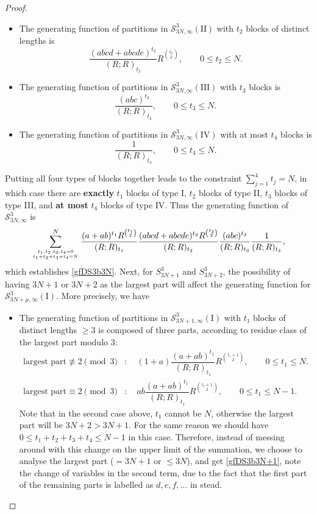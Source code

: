 \documentclass[12pt]{amsart}
\numberwithin{equation}{section}
\theoremstyle{plain}
\theoremstyle{definition}
\begin{document}
\begin{proof}
\begin{itemize}
\item[II.] The generating function of partitions in $\mathcal{S}^3_{3N,\infty}(\text{II})$ with  
$t_2$ blocks of distinct lengths  is 
$$
\dfrac{(abcd+abcde)^{t_2}}{(R;R)_{t_2}}R^{\binom{t_2}{2}}, \qquad 0\leq  t_2\leq N.
$$ 
\item[III.] The generating function of partitions in $\mathcal{S}^3_{3N,\infty}(\text{III})$ with  
$t_3$ blocks is 
$$
\dfrac{(abc)^{t_3}}{(R;R)_{t_3}}, \qquad 0\leq  t_3\leq N.
$$ 
\item[IV.] The generating function of partitions in $\mathcal{S}^3_{3N,\infty}(\text{IV})$ with  at most 
$t_4$ blocks  is 
$$
\dfrac{1}{(R;R)_{t_4}}, \qquad 0\leq  t_4\leq N.
$$ 
\end{itemize}
Putting all four types of blocks together leads to
 the constraint $\sum_{j=1}^4t_j=N$, in which case there are {\bf exactly} $t_1$ blocks of type I, $t_2$ blocks of type II, $t_3$ blocks of type III, and {\bf at most} $t_4$ blocks of type IV. 
 Thus the generating function of $\mathcal{S}^3_{3N,\infty}$ is
$$
\sum\limits_{t_1,t_2,t_3,t_4=0\atop t_1+t_2+t_3+t_4=N}^N \dfrac{(a+ab)^{t_1}R^{\binom{t_1}{2}}}{(R;R)_{t_1}}\dfrac{(abcd+abcde)^{t_2}R^{\binom{t_2}{2}}}{(R;R)_{t_2}}\dfrac{(abc)^{t_3}}{(R;R)_{t_3}}\dfrac{1}{(R;R)_{t_4}}\\{},
$$
which establishes \eqref{gfDS3b3N}. Next, for $S_{3N+1}^3$ and $S_{3N+2}^3$, the possibility of having $3N+1$ or $3N+2$ as the largest part will affect the generating function for $\mathcal{S}^3_{3N+\mu,\infty}(\text{I})$. More precisely, we have
\begin{itemize}
\item The generating function of partitions in $\mathcal{S}^3_{3N+1,\infty}(\text{I})$ with  
$t_1$ blocks of distinct lengths $\geq 3$ is composed of three parts, according to residue class of the largest part modulo $3$:
\begin{align*}
\text{largest part}\not\equiv 2 \pmod 3&: \quad (1+a)\dfrac{(a+ab)^{t_1}}{(R;R)_{t_1}}R^{\binom{t_1+1}{2}}, \qquad 0\leq  t_1\leq N.\\
\text{largest part}\equiv 2 \pmod 3 &: \quad ab\dfrac{(a+ab)^{t_1}}{(R;R)_{t_1}}R^{\binom{t_1+1}{2}}, \qquad 0\leq  t_1\leq N-1.
\end{align*}
Note that in the second case above, $t_1$ cannot be $N$, otherwise the largest part will be $3N+2>3N+1$. For the same reason we should have $0\leq t_1+t_2+t_3+t_4\leq N-1$ in this case. Therefore, instead of messing around with this change on the upper limit of the summation, we choose to analyse the largest part ($=3N+1$ or $\leq 3N$), and get \eqref{gfDS3b3N+1}, note the change of variables in the second term, due to the fact that the first part of the remaining parts is labelled as $d,e,f,\ldots$ in stead.

\end{itemize}
\end{proof}
\end{document}
